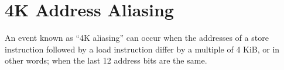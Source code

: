 \documentclass[a4paper,10pt,twocolumn,twoside]{article}
\begin{document}
\section{4K Address Aliasing}


%



An event known as “4K aliasing” can occur when the addresses of a store instruction followed by a load instruction differ by a multiple of 4 KiB, or in other words; when the last 12 address bits are the same.
\end{document}
